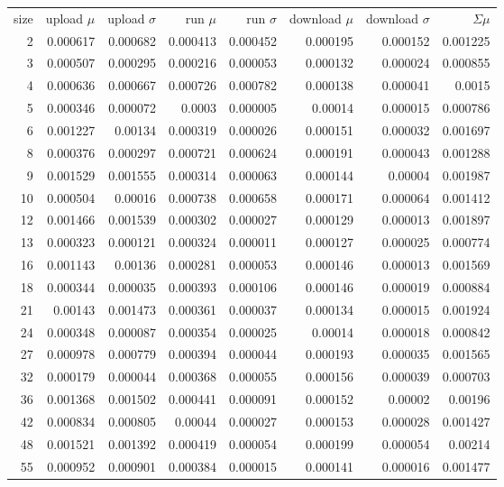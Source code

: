 \begin{longtable}{r r r r r r r r}
size & upload $\mu$  & upload $\sigma$ & run $\mu$ & run $\sigma$ & download $\mu$ & download $\sigma$ & $\Sigma \mu$ \\
2 & 0.000617 & 0.000682 & 0.000413 & 0.000452 & 0.000195 & 0.000152 & 0.001225 \\
3 & 0.000507 & 0.000295 & 0.000216 & 0.000053 & 0.000132 & 0.000024 & 0.000855 \\
4 & 0.000636 & 0.000667 & 0.000726 & 0.000782 & 0.000138 & 0.000041 & 0.0015 \\
5 & 0.000346 & 0.000072 & 0.0003 & 0.000005 & 0.00014 & 0.000015 & 0.000786 \\
6 & 0.001227 & 0.00134 & 0.000319 & 0.000026 & 0.000151 & 0.000032 & 0.001697 \\
8 & 0.000376 & 0.000297 & 0.000721 & 0.000624 & 0.000191 & 0.000043 & 0.001288 \\
9 & 0.001529 & 0.001555 & 0.000314 & 0.000063 & 0.000144 & 0.00004 & 0.001987 \\
10 & 0.000504 & 0.00016 & 0.000738 & 0.000658 & 0.000171 & 0.000064 & 0.001412 \\
12 & 0.001466 & 0.001539 & 0.000302 & 0.000027 & 0.000129 & 0.000013 & 0.001897 \\
13 & 0.000323 & 0.000121 & 0.000324 & 0.000011 & 0.000127 & 0.000025 & 0.000774 \\
16 & 0.001143 & 0.00136 & 0.000281 & 0.000053 & 0.000146 & 0.000013 & 0.001569 \\
18 & 0.000344 & 0.000035 & 0.000393 & 0.000106 & 0.000146 & 0.000019 & 0.000884 \\
21 & 0.00143 & 0.001473 & 0.000361 & 0.000037 & 0.000134 & 0.000015 & 0.001924 \\
24 & 0.000348 & 0.000087 & 0.000354 & 0.000025 & 0.00014 & 0.000018 & 0.000842 \\
27 & 0.000978 & 0.000779 & 0.000394 & 0.000044 & 0.000193 & 0.000035 & 0.001565 \\
32 & 0.000179 & 0.000044 & 0.000368 & 0.000055 & 0.000156 & 0.000039 & 0.000703 \\
36 & 0.001368 & 0.001502 & 0.000441 & 0.000091 & 0.000152 & 0.00002 & 0.00196 \\
42 & 0.000834 & 0.000805 & 0.00044 & 0.000027 & 0.000153 & 0.000028 & 0.001427 \\
48 & 0.001521 & 0.001392 & 0.000419 & 0.000054 & 0.000199 & 0.000054 & 0.00214 \\
55 & 0.000952 & 0.000901 & 0.000384 & 0.000015 & 0.000141 & 0.000016 & 0.001477 \\

\end{longtable}
